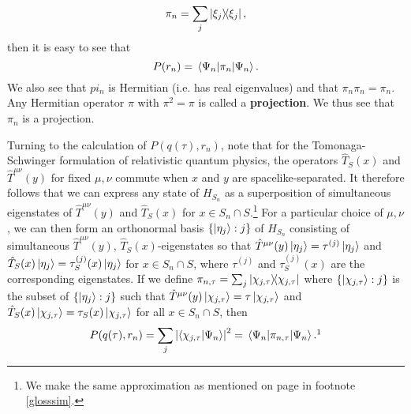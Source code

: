 \begin{equation}\label{tauprojection}
\pi_n=\sum_j\dyad{\xi_j},
\end{equation}
then it is easy to see that
$$P(r_n)=\ev*{\pi_n}{\Psi_n}.$$
We also see that $pi_n$ is Hermitian (i.e. has real eigenvalues) and that $\pi_n \pi_n = \pi_n$. Any Hermitian operator $\pi$ with $\pi^2=\pi$ is called a \textbf{projection}. We thus see that $\pi_n$ is a projection.

Turning to the calculation of $P(q(\tau), r_n)$, note that for the Tomonaga-Schwinger formulation of relativistic quantum physics, the operators $\hat{T}_S(x)$ and $\hat{T}^{\mu\nu}(y)$ for fixed $\mu,\nu$ commute when $x$ and $y$ are spacelike-separated. It therefore follows that we can express any state of $H_{S_n}$ as a superposition of simultaneous eigenstates of $\hat{T}^{\mu\nu}(y)$ and $\hat{T}_S(x)$ for $x\in S_n\cap S$.\footnote{We make the same approximation as mentioned on page \pageref{simultaneous} in footnote \ref{glosssim}.}  For a particular choice of $\mu,\nu$, we can then form an orthonormal basis $\{\ket{\eta_j}:j\}$ of $H_{S_n}$ consisting of simultaneous $\hat{T}^{\mu\nu}(y)$, $\hat{T}_S(x)$-eigenstates so that $\hat{T}^{\mu\nu}(y)\ket{\eta_j}=\tau^{(j)}\ket{\eta_j}$ and $\hat{T}_{S}(x)\ket{\eta_j}=\tau_S^{(j)}(x)\ket{\eta_j}$ for $x\in S_n\cap S$, where $\tau^{(j)}$ and $\tau_S^{(j)}(x)$ are the corresponding eigenstates. If we define  $\pi_{n,\tau}=\sum_j\dyad{\chi_{j,\tau}}$ where $\{\ket{\chi_{j,\tau}}:j\}$ is the subset of $\{\ket{\eta_j}:j\}$ such that $\hat{T}^{\mu\nu}(y)\ket{\chi_{j,\tau}}=\tau\ket{\chi_{j,\tau}}$ and $\hat{T}_S(x)\ket{\chi_{j,\tau}}=\tau_S(x)\ket{\chi_{j,\tau}}$ for all $x\in S_n\cap S$, then 
\begin{equation}\label{pqtauri}
P(q(\tau), r_n)=\sum_j \abs{ \ip{\chi_{j,\tau}}{\Psi_n}}^2=\ev*{\pi_{n,\tau}}{\Psi_n}.\protect\footnotemark
\end{equation}
